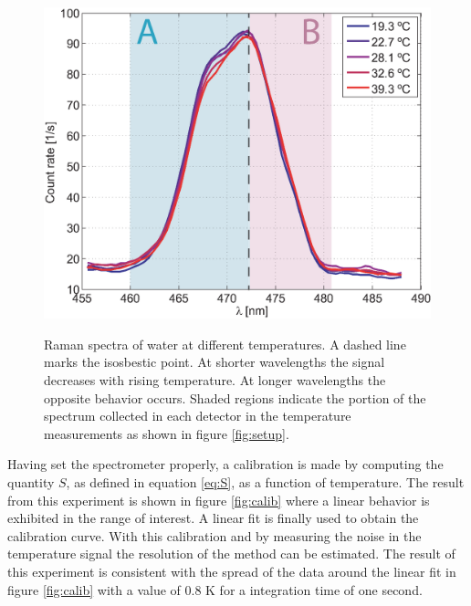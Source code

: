 \documentclass[twocolumn]{svjour3}       %
\begin{document}
\begin{figure}[h!]
\centering
\includegraphics[width=\columnwidth]{figs/spectra.eps}
\label{fig:spectra}
\caption{Raman spectra of water at different temperatures. A dashed line marks the isosbestic point. At shorter wavelengths the signal decreases with rising temperature. At longer wavelengths the opposite behavior occurs. Shaded regions indicate the portion of the spectrum collected in each detector in the temperature measurements as shown in figure \ref{fig:setup}.}
\end{figure}

Having set the spectrometer properly, a calibration is made by computing the quantity $S$, as defined in equation \ref{eq:S}, as a function of temperature. The result from this experiment is shown in figure \ref{fig:calib} where a linear behavior is exhibited in the range of interest. A linear fit is finally used to obtain the calibration curve. With this calibration and by measuring the noise in the temperature signal  the resolution of the method can be estimated. The result of this experiment is consistent with the spread of the data around the linear fit in figure \ref{fig:calib} with a value of 0.8 K for a integration time of one second.
\end{document}
